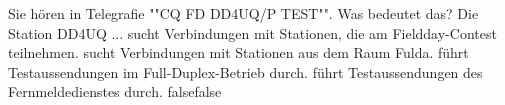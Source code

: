     {Sie hören in Telegrafie ""CQ FD DD4UQ/P TEST"". Was bedeutet das? Die Station DD4UQ ...}
    {sucht Verbindungen mit Stationen, die am Fieldday-Contest teilnehmen.}
    {sucht Verbindungen mit Stationen aus dem Raum Fulda.}
    {führt Testaussendungen im Full-Duplex-Betrieb durch.}
    {führt Testaussendungen des Fernmeldedienstes durch.}
    {false}{false}